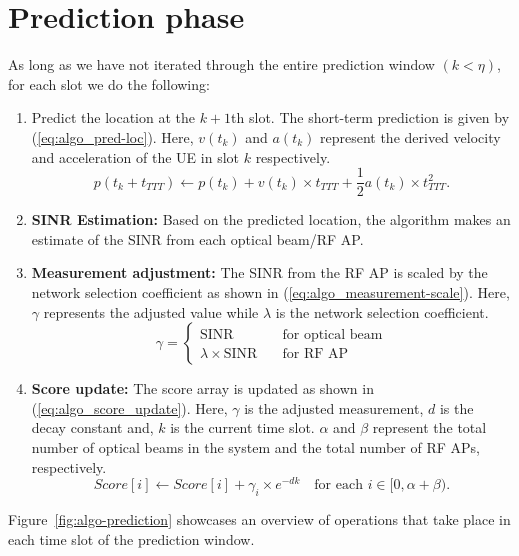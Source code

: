 \section{Prediction phase}
As long as we have not iterated through the entire prediction window $(k < \eta)$, for each slot we do the following:
\begin{enumerate}
    \item Predict the location at the $k+1$th slot. The short-term prediction is given by (\ref{eq:algo_pred-loc}). Here, $v(t_k)$ and $a(t_k)$ represent the derived velocity and acceleration of the UE in slot $k$ respectively.
    \begin{equation}
        p(t_k + t_{TTT}) \leftarrow p(t_k) + v(t_k) \times t_{TTT} + \frac{1}{2}a(t_k) \times t_{TTT}^2.
        \label{eq:algo_pred-loc}
    \end{equation}
    \item \textbf{SINR Estimation:} Based on the predicted location, the algorithm makes an estimate of the SINR from each optical beam/RF AP. 
    \item \textbf{Measurement adjustment: } The SINR from the RF AP is scaled by the network selection coefficient as shown in (\ref{eq:algo_measurement-scale}). Here, $\gamma$ represents the adjusted value while $\lambda$ is the network selection coefficient.
    \begin{equation}
        \gamma = 
\begin{cases} 
\text{SINR} \quad &\text{for optical beam} \\
\lambda \times \text{SINR} \quad &\text{for RF AP}
\end{cases}
\label{eq:algo_measurement-scale}
    \end{equation}
    \item \textbf{Score update:} The score array is updated as shown in (\ref{eq:algo_score_update}). Here, $\gamma$ is the adjusted measurement, $d$ is the decay constant and, $k$ is the current time slot. $\alpha$ and $\beta$ represent the total number of optical beams in the system and the total number of RF APs, respectively. 
    \begin{equation}
        Score[i] \leftarrow Score[i] + \gamma_i \times e^{-dk} \quad \text{for each } i \in [0, \alpha + \beta). 
        \label{eq:algo_score_update}
    \end{equation}

\end{enumerate}
Figure~\ref{fig:algo-prediction} showcases an overview of operations that take place in each time slot of the prediction window.
